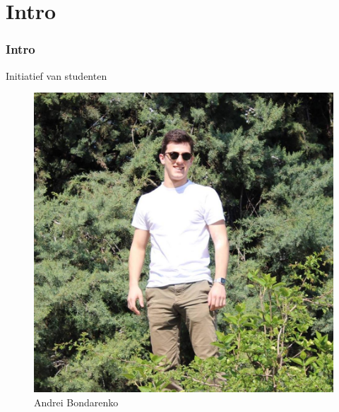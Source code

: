	\section{Intro}
    \addtocounter{minutes}{2}
	\begin{frame}
		\frametitle{Intro} 
        Initiatief van studenten
        
        \begin{figure}
        	\begin{minipage}{0.3\linewidth}
                \centering
            	\includegraphics[width=\linewidth]{res/andrei} \\
            	\footnotesize Andrei Bondarenko
            \end{minipage}
            \begin{minipage}{0.3\linewidth}
            	\centering

\end{minipage}
\end{figure}
\end{frame}
